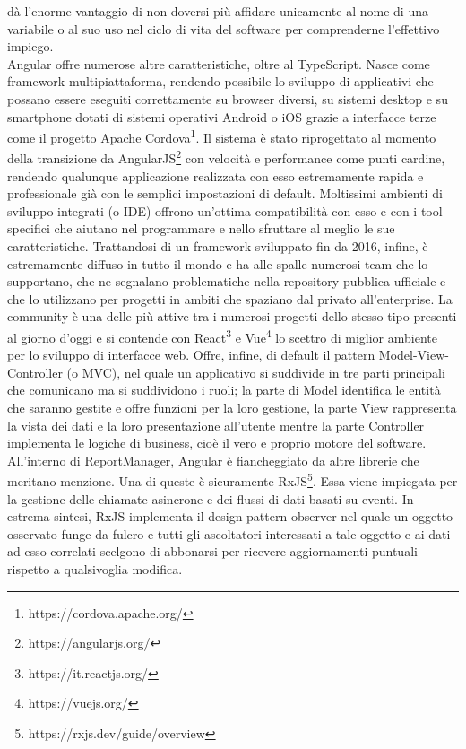 dà l'enorme vantaggio di non doversi più affidare unicamente al nome di una variabile o al suo uso nel ciclo di vita del software per comprenderne l'effettivo impiego.
\\
Angular offre numerose altre caratteristiche, oltre al TypeScript.
Nasce come framework multipiattaforma, rendendo possibile lo sviluppo di applicativi che possano essere eseguiti correttamente su browser diversi, su sistemi desktop e su 
smartphone dotati di sistemi operativi Android o iOS grazie a interfacce terze come il progetto Apache Cordova\footnote{https://cordova.apache.org/}.
Il sistema è stato riprogettato al momento della transizione da AngularJS\footnote{https://angularjs.org/} con velocità e performance come punti cardine, rendendo qualunque applicazione realizzata con esso estremamente
rapida e professionale già con le semplici impostazioni di default.
Moltissimi ambienti di sviluppo integrati (o IDE) offrono un'ottima compatibilità con esso e con i tool specifici che aiutano nel programmare e nello sfruttare al meglio le sue 
caratteristiche.
Trattandosi di un framework sviluppato fin da 2016, infine, è estremamente diffuso in tutto il mondo e ha alle spalle numerosi team che lo supportano,
che ne segnalano problematiche nella repository pubblica ufficiale e che lo utilizzano per progetti in ambiti che spaziano dal privato all'enterprise.
La community è una delle più attive tra i numerosi progetti dello stesso tipo presenti al giorno d'oggi e si contende con React\footnote{https://it.reactjs.org/} e
Vue\footnote{https://vuejs.org/} lo scettro di miglior ambiente per lo sviluppo di interfacce web.
Offre, infine, di default il pattern Model-View-Controller (o MVC), nel quale un applicativo si suddivide in tre parti principali che comunicano ma si suddividono i ruoli;
la parte di Model identifica le entità che saranno gestite e offre funzioni per la loro gestione, la parte View rappresenta la vista dei dati e la loro presentazione all'utente mentre
la parte Controller implementa le logiche di business, cioè il vero e proprio motore del software.
\\
All'interno di ReportManager, Angular è fiancheggiato da altre librerie che meritano menzione.
Una di queste è sicuramente RxJS\footnote{https://rxjs.dev/guide/overview}. Essa viene impiegata per la gestione delle chiamate asincrone e dei flussi di dati basati su eventi.
In estrema sintesi, RxJS implementa il design pattern observer nel quale un oggetto osservato funge da fulcro e tutti gli ascoltatori interessati a tale oggetto e ai dati ad esso
correlati scelgono di abbonarsi per ricevere aggiornamenti puntuali rispetto a qualsivoglia modifica.
